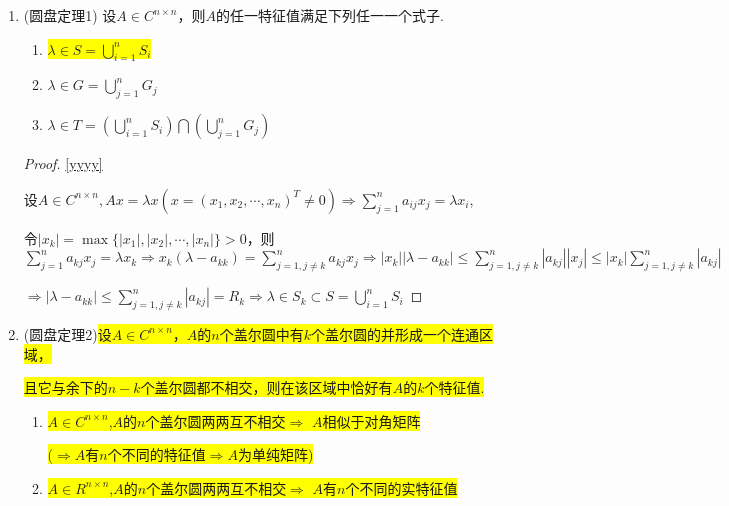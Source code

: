 \begin{theorem}
\begin{enumerate}
	\item (圆盘定理1) 设$A\in C^{n\times n}$，则$A$的任一特征值满足下列任一一个式子.
		\begin{enumerate}
			\item \label{yyyy}\colorbox{yellow}{$ \lambda \in S=\bigcup\limits_{i=1}^{n}S_i$}
	    	\item$ \lambda \in G=\bigcup\limits_{j=1}^{n}G_j$
	    	\item$ \lambda \in T= \left(\bigcup\limits_{i=1}^{n}S_i \right)\bigcap\left(\bigcup\limits_{j=1}^{n}G_j \right)$
		\end{enumerate}
	\begin{proof}
	\ref{yyyy}
	
	设$A\in C^{n\times n}, Ax=\lambda x \left(x=(x_1,x_2,\cdots,x_n)^T \ne0\right) \Rightarrow \sum\limits_{j=1}^na_{ij}x_j=\lambda x_i$,
	
	令$|x_k|=\max\{|x_1|,|x_2|,\cdots,|x_n|\}>0$，则$\sum\limits_{j=1}^na_{kj}x_j=\lambda x_k\Rightarrow x_k(\lambda -a_{kk})=\sum\limits_{j=1,j\ne k}^na_{kj}x_j\Rightarrow |x_k||\lambda -a_{kk}|\leq \sum\limits_{j=1,j\ne k}^n |a_{kj}||x_j|\leq |x_k|\sum\limits_{j=1,j\ne k}^n |a_{kj}|$
	
	$\Rightarrow |\lambda -a_{kk}|\leq \sum\limits_{j=1,j\ne k}^n |a_{kj}|=R_k\Rightarrow \lambda \in S_k\subset S=\bigcup\limits_{i=1}^{n}S_i$	
	
	\end{proof}
\item(圆盘定理2)\colorbox{yellow}{设$A\in C^{n\times n}$，$A$的$n$个盖尔圆中有$k$个盖尔圆的并形成一个连通区域，}

\colorbox{yellow}{且它与余下的$n-k$个盖尔圆都不相交，则在该区域中恰好有$A$的$k$个特征值.}


\begin{corollary}
\begin{enumerate}
	\item \colorbox{yellow}{$A\in C^{n\times n}$,$A$的$n$个盖尔圆两两互不相交$\Rightarrow$ $A$相似于对角矩阵}
	
	\colorbox{yellow}{($\Rightarrow A$有$n$个不同的特征值$\Rightarrow A$为单纯矩阵)}	
	\item \colorbox{yellow}{$A\in R^{n\times n}$,$A$的$n$个盖尔圆两两互不相交$\Rightarrow$ $A$有$n$个不同的实特征值}	
\end{enumerate}
\end{corollary}

\end{enumerate}
\end{theorem}

